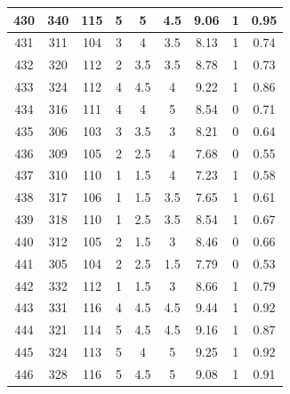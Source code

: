 \documentclass[11pt]{article}
\begin{document}
\begin{appendix}
\begin{longtable}[H]{|c|c|c|c|c|c|c|c|c|}
	430        & 340       & 115         & 5                 & 5   & 4.5 & 9.06 & 1        & 0.95            \\ \hline
	431        & 311       & 104         & 3                 & 4   & 3.5 & 8.13 & 1        & 0.74            \\ \hline
	432        & 320       & 112         & 2                 & 3.5 & 3.5 & 8.78 & 1        & 0.73            \\ \hline
	433        & 324       & 112         & 4                 & 4.5 & 4   & 9.22 & 1        & 0.86            \\ \hline
	434        & 316       & 111         & 4                 & 4   & 5   & 8.54 & 0        & 0.71            \\ \hline
	435        & 306       & 103         & 3                 & 3.5 & 3   & 8.21 & 0        & 0.64            \\ \hline
	436        & 309       & 105         & 2                 & 2.5 & 4   & 7.68 & 0        & 0.55            \\ \hline
	437        & 310       & 110         & 1                 & 1.5 & 4   & 7.23 & 1        & 0.58            \\ \hline
	438        & 317       & 106         & 1                 & 1.5 & 3.5 & 7.65 & 1        & 0.61            \\ \hline
	439        & 318       & 110         & 1                 & 2.5 & 3.5 & 8.54 & 1        & 0.67            \\ \hline
	440        & 312       & 105         & 2                 & 1.5 & 3   & 8.46 & 0        & 0.66            \\ \hline
	441        & 305       & 104         & 2                 & 2.5 & 1.5 & 7.79 & 0        & 0.53            \\ \hline
	442        & 332       & 112         & 1                 & 1.5 & 3   & 8.66 & 1        & 0.79            \\ \hline
	443        & 331       & 116         & 4                 & 4.5 & 4.5 & 9.44 & 1        & 0.92            \\ \hline
	444        & 321       & 114         & 5                 & 4.5 & 4.5 & 9.16 & 1        & 0.87            \\ \hline
	445        & 324       & 113         & 5                 & 4   & 5   & 9.25 & 1        & 0.92            \\ \hline
	446        & 328       & 116         & 5                 & 4.5 & 5   & 9.08 & 1        & 0.91            \\ \hline

\end{longtable}
\end{appendix}
\end{document}
